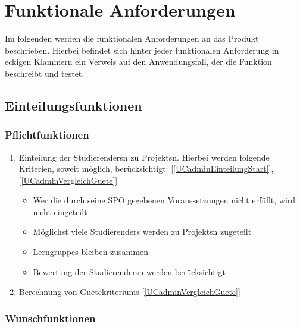\documentclass[parskip=full]{scrartcl}
\newcommand{\swtLabel}[1]{\textbf{/#1\arabic*0/}}
\newcommand{\testRef}[1]{[\ref{#1}]}
\begin{document}
\section{Funktionale Anforderungen}

Im folgenden werden die funktionalen Anforderungen an das Produkt beschrieben.
Hierbei befindet sich hinter jeder funktionalen Anforderung in eckigen Klammern
ein Verweis auf den Anwendungsfall, der die Funktion beschreibt und testet.

\subsection{Einteilungsfunktionen}
\subsubsection{Pflichtfunktionen}
\begin{enumerate}[label=\swtLabel{FA}]
  \item \gls{Einteilung} der \glspl{Studierender}n zu \glspl{Projekt}n. Hierbei werden
  folgende Kriterien, soweit möglich, berücksichtigt:
  \testRef{UCadminEinteilungStart}, \testRef{UCadminVergleichGuete}
  \begin{itemize}
    \item Wer die durch seine \gls{SPO} gegebenen Voraussetzungen nicht erfüllt,
    wird nicht eingeteilt \label{FAeinteilung}
    \item Möglichst viele \glspl{Studierender} werden zu \glspl{Projekt}n zugeteilt 
    \item \glspl{Lerngruppe} bleiben zusammen
    \item \gls{Bewertung} der \glspl{Studierender}n werden berücksichtigt 
 \end{itemize} \label{FAeinteilungMussKriterien} 
 \item Berechnung von \glspl{Guetekriterium} \label{FAguetekriterien}
 \testRef{UCadminVergleichGuete}
 
\end{enumerate}

 \subsubsection{Wunschfunktionen}
 
\end{document}
